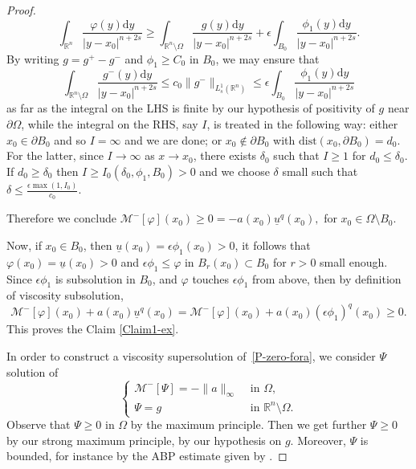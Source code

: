 \documentclass[11pt]{article}
\newcommand{\R}{\mathbb{R}}
\newcommand{\rmd}{\mathrm{d}}
\begin{document}
\begin{proof}
\[
\int_{\R^n} \frac{\varphi (y) \rmd y }{|y-x_0|^{n+2s}} 
\ge 
\int_{\R^n\setminus\Omega} \frac{g (y) \rmd y }{|y-x_0|^{n+2s}} 
+ \epsilon \int_{B_0} \frac{\phi_1 (y)\rmd y }{|y-x_0|^{n+2s}} .\] 
By writing $g=g^+-g^-$ and $\phi_1\ge C_0$ in $B_0$, we may ensure that
$$
\int_{\R^n\setminus\Omega} \frac{g^- (y) \rmd y }{|y-x_0|^{n+2s}} 
 \le c_0 \|g^{-}\|_{L^{1}_{s}(\mathbb{R}^n)}
\le \epsilon \int_{B_0} \frac{\phi_1 (y)\rmd y }{|y-x_0|^{n+2s}} 
$$
as far as the integral on the LHS is finite by our hypothesis of positivity of $g$ near $\partial\Omega$, while the integral on the RHS, say $I$, is treated in the following way: 
either $x_0\in \partial B_0 $ and so $I=\infty$ and we are done; 
or $x_0\not\in \partial B_0 $ with $\mathrm{dist}(x_0, \partial B_0)=d_0$. 
For the latter, since $I\to \infty $ as $x\to x_0$, there exists $\delta_0$ such that $I\ge 1$ for $d_0 \le \delta_0$. 
If  $d_0\ge \delta_0$ then $I\ge I_0 (\delta_0,\phi_1,B_0)>0$ and we choose $\delta$ small such that $\delta \le \frac{\epsilon \max (1, I_0 ) }{c_0}$.  

\smallskip

Therefore we conclude $\mathcal{M}^{-}[\varphi](x_0) 
\ge  0 =-a(x_0)\underline{u}^{q}(x_0), $
for $x_0 \in \Omega\setminus B_0$.
\medskip

Now, if \(x_0\in B_0\), then \(\underline{u}(x_0) = \epsilon\phi_{1}(x_0)>0\), it follows that \(\varphi(x_0) = \underline{u}(x_0)>0\) and \(\epsilon\phi_1\leq \varphi\) in \(B_{r}(x_0)\subset B_0\) for \(r>0\) small enough. Since \(\epsilon\phi_1\) is subsolution in \(B_0\), and \(\varphi\) touches \(\epsilon\phi_1\) from above, then by definition of viscosity subsolution,
\[\mathcal{M}^{-}[\varphi](x_0) + a(x_0)\underline{u}^{q}(x_0) = \mathcal{M}^{-}[\varphi](x_0) + a(x_0)(\epsilon \phi_1)^{q}(x_0)\geq 0.\]
This proves the Claim \ref{Claim1-ex}.

In order to construct a viscosity supersolution of~\eqref{P-zero-fora}, we consider \(\Psi\) solution of
\begin{equation*}
    \begin{cases}
        \mathcal{M}^{-}[\Psi] = -\|a\|_{\infty} & \text{ in } \Omega, \\[4pt]
        \Psi = g & \text{ in } \mathbb{R}^{n} \setminus \Omega.
    \end{cases}
\end{equation*}
Observe that $\Psi\ge 0$ in $\Omega$ by the maximum principle. Then we get further $\Psi\ge 0$ by our strong maximum principle, by our hypothesis on $g$. Moreover, $\Psi $ is bounded, for instance by the ABP estimate given by \cite[Theorem 3.1]{Kitano}.


\end{proof}
\end{document}

